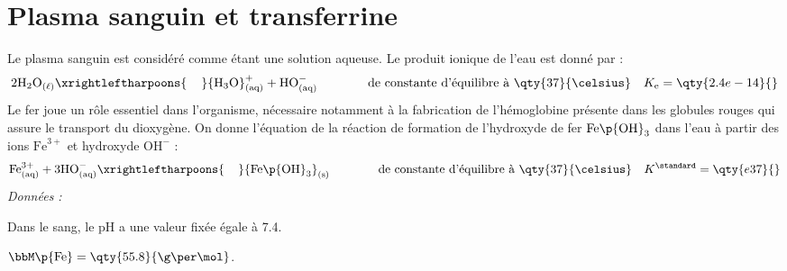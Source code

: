 \documentclass[a4paper,french,bookmarks]{article}
\begin{document}
    \renewcommand{\thesection}{\Roman{section}} 
    \renewcommand{\thesubsection}{\thesection.\Alph{subsection}}
    \renewcommand{\labelenumi}{\thesection.\arabic{enumi}.}
    \renewcommand*{\labelenumii}{\alph{enumii}.}
    \renewcommand*{\labelenumiii}{\alph{enumiii}.}
    

    \section{Plasma sanguin et transferrine}

    Le plasma sanguin est considéré comme étant une solution aqueuse. Le produit ionique de l'eau est donné par :
    \[ 2{\text H_2\text O}_\text{($\ell$)} \xrightleftharpoons{\hspace{0.4cm}} {\text H_3\text O}^+_\text{(aq)} + {\text H\text O}^-_\text{(aq)} \qquad\qquad\text{de constante d'équilibre à $\qty{37}{\celsius}$}\quad K_\text e=\qty{2.4e-14}{} \]
    Le fer joue un rôle essentiel dans l'organisme, nécessaire notamment à la fabrication de l'hémoglobine présente dans les globules rouges qui assure le transport du dioxygène. On donne l'équation de la réaction de formation de l'hydroxyde de fer $\text{Fe}\p{\text O\text H}_3$ dans l'eau à partir des ions $\text{Fe}^{3+}$ et hydroxyde $\text{OH}^{-}$ :
    \begin{equation}
        \label{eq:eq1}
        \text{Fe}^{3+}_\text{(aq)} + 3{\text H\text O}^-_\text{(aq)} \xrightleftharpoons{\hspace{0.4cm}} {\text{Fe}\p{\text O\text H}_3}_\text{(s)} \qquad\qquad\text{de constante d'équilibre à $\qty{37}{\celsius}$}\quad K^\standard = \qty{e37}{}
    \end{equation}
    \emph{Données :}
    \begin{enumerate}
        \itt Dans le sang, le pH a une valeur fixée égale à \qty{7.4}{}.
        
        \itt $\bbM\p{\text{Fe}} = \qty{55.8}{\g \per \mol}$.
    \end{enumerate}
    
\end{document}

